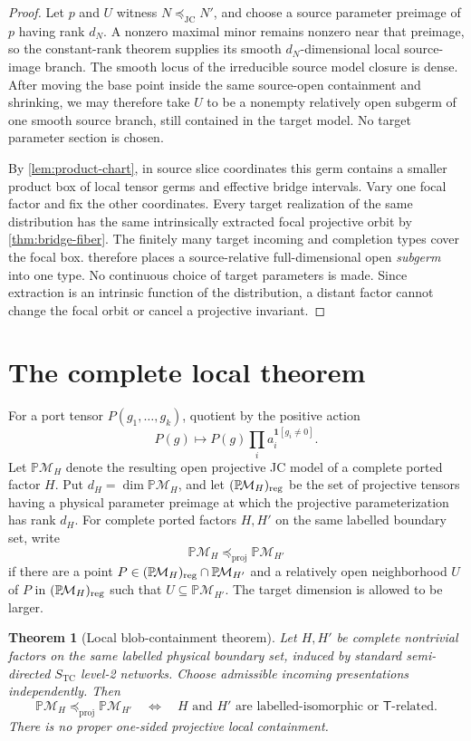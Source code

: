 \documentclass[11pt]{article}
\newtheorem{theorem}{Theorem}[section]
\theoremstyle{remark}
\newcommand{\M}{\mathcal M}
\newcommand{\TCs}{S_{\mathrm{TC}}}
\newcommand{\JC}{\mathrm{JC}}
\newcommand{\Tmove}{\mathsf T}
\newcommand{\preceqjc}{\preceq_{\!\JC}}
\newcommand{\preceqproj}{\preceq_{\!\mathrm{proj}}}
\newcommand{\PM}{\mathbb P\!\M}
\begin{document}
\begin{proof}
Let $p$ and $U$ witness $N\preceqjc N'$, and choose a source parameter
preimage of $p$ having rank $d_N$.  A nonzero maximal minor remains nonzero
near that preimage, so the constant-rank theorem supplies its smooth
$d_N$-dimensional local source-image branch.  The smooth locus of the
irreducible source model closure is dense.  After moving the base point
inside the same source-open containment and shrinking, we may therefore take
$U$ to be a nonempty relatively open subgerm of one smooth source branch,
still contained in the target model.  No target parameter section is chosen.

By \cref{lem:product-chart}, in source slice coordinates this germ contains a
smaller product box of local tensor germs and effective bridge intervals.
Vary one
focal factor and fix the other coordinates.  Every target realization of the
same distribution has the same intrinsically extracted focal projective
orbit by \cref{thm:bridge-fiber}.  The finitely many target incoming and
completion types cover the focal box.   therefore
places a source-relative full-dimensional open \emph{subgerm} into one type.
No continuous choice of target parameters is made.  Since extraction is an
intrinsic function of the distribution, a distant factor cannot change the
focal orbit or cancel a projective invariant.
\end{proof}

\section{The complete local theorem}\label{sec:local}

For a port tensor $P(g_1,\ldots,g_k)$, quotient by the positive action
\[
P(g)\longmapsto P(g)\prod_i a_i^{\mathbf1[g_i\ne0]}.
\]
Let $\PM_H$ denote the resulting open projective JC model of a complete
ported factor $H$.  Put $d_H=\dim\PM_H$, and let $(\PM_H)_{\rm reg}$ be the
set of projective tensors having a physical parameter preimage at which the
projective parameterization has rank $d_H$.  For complete ported factors
$H,H'$ on the same labelled boundary set, write
\[
  \PM_H\preceqproj\PM_{H'}
\]
if there are a point
$P\in(\PM_H)_{\rm reg}\cap\PM_{H'}$ and a relatively open neighborhood $U$
of $P$ in $(\PM_H)_{\rm reg}$ such that $U\subseteq\PM_{H'}$.  The target
dimension is allowed to be larger.

\begin{theorem}[Local blob-containment theorem]\label{thm:local}
Let $H,H'$ be complete nontrivial factors on the same labelled physical
boundary set, induced by standard semi-directed $\TCs$ level-2 networks.
Choose admissible incoming presentations independently.  Then
\[
\PM_H\preceqproj\PM_{H'}
\quad\Longleftrightarrow\quad
H\text{ and }H'\text{ are labelled-isomorphic or }\Tmove\text{-related}.
\]
There is no proper one-sided projective local containment.
\end{theorem}
\end{document}
